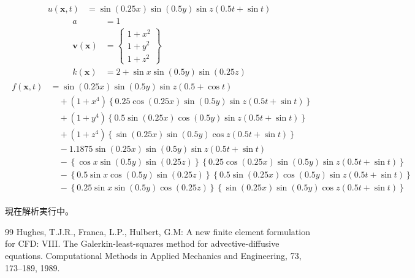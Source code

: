 \documentclass[8pt,a4paper]{article}
\newcommand{\bsm}{\boldsymbol}
\begin{document}
\begin{align}
	u (\bsm{x}, t) &= \sin \left( 0.25 x \right) \sin \left( 0.5 y \right) \sin z \left( 0.5 t + \sin t \right)
\end{align}
\begin{align}
	a &= 1 \\
	\bsm{v} (\bsm{x}) &= 
	\begin{Bmatrix}
		1 + x^2 \\
		1 + y^2 \\
		1 + z^2
	\end{Bmatrix} \\
	k (\bsm{x}) &= 2 + \sin x \sin \left( 0.5 y \right) \sin \left( 0.25 z \right)
\end{align}
\begin{align}
	\begin{split}
		f (\bsm{x}, t) &= \sin \left( 0.25 x \right) \sin \left( 0.5 y \right) \sin z \left( 0.5 + \cos t \right) \\
		& \quad + \left( 1 + x^4 \right) \left\{ 0.25 \cos \left( 0.25 x \right) \sin \left( 0.5 y \right) \sin z \left( 0.5 t + \sin t \right) \right\} \\
		& \quad + \left( 1 + y^4 \right) \left\{ 0.5  \sin \left( 0.25 x \right) \cos \left( 0.5 y \right) \sin z \left( 0.5 t + \sin t \right) \right\} \\
		& \quad + \left( 1 + z^4 \right) \left\{      \sin \left( 0.25 x \right) \sin \left( 0.5 y \right) \cos z \left( 0.5 t + \sin t \right) \right\} \\
		& \quad - 1.1875 \sin \left( 0.25 x \right) \sin \left( 0.5 y \right) \sin z \left( 0.5 t + \sin t \right) \\
		& \quad - \left\{     \cos x \sin \left( 0.5 y \right) \sin \left( 0.25 z \right) \right\} \left\{ 0.25 \cos \left( 0.25 x \right) \sin \left( 0.5 y \right) \sin z \left( 0.5 t + \sin t \right) \right\} \\
		& \quad - \left\{0.5  \sin x \cos \left( 0.5 y \right) \sin \left( 0.25 z \right) \right\} \left\{ 0.5  \sin \left( 0.25 x \right) \cos \left( 0.5 y \right) \sin z \left( 0.5 t + \sin t \right) \right\} \\
		& \quad - \left\{0.25 \sin x \sin \left( 0.5 y \right) \cos \left( 0.25 z \right) \right\} \left\{      \sin \left( 0.25 x \right) \sin \left( 0.5 y \right) \cos z \left( 0.5 t + \sin t \right) \right\} 
	\end{split}
\end{align}

現在解析実行中。

\begin{thebibliography}{99}
	 Hughes, T.J.R., Franca, L.P., Hulbert, G.M: A new finite element formulation for CFD: VIII. The Galerkin-least-squares method for advective-diffusive equations. Computational Methods in Applied Mechanics and Engineering, 73, 173--189, 1989.
\end{thebibliography}
\end{document}
